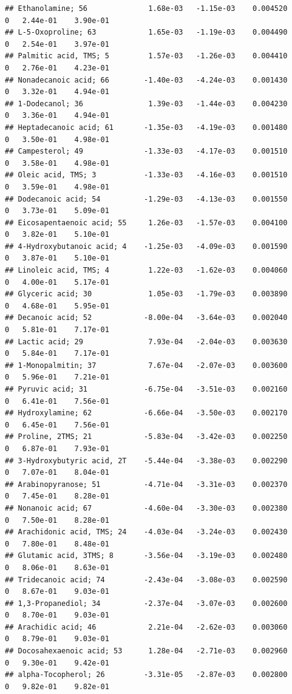 \documentclass[]{article}
\begin{document}
\begin{verbatim}
## Ethanolamine; 56              1.68e-03   -1.15e-03    0.004520         0   2.44e-01    3.90e-01
## L-5-Oxoproline; 63            1.65e-03   -1.19e-03    0.004490         0   2.54e-01    3.97e-01
## Palmitic acid, TMS; 5         1.57e-03   -1.26e-03    0.004410         0   2.76e-01    4.23e-01
## Nonadecanoic acid; 66        -1.40e-03   -4.24e-03    0.001430         0   3.32e-01    4.94e-01
## 1-Dodecanol; 36               1.39e-03   -1.44e-03    0.004230         0   3.36e-01    4.94e-01
## Heptadecanoic acid; 61       -1.35e-03   -4.19e-03    0.001480         0   3.50e-01    4.98e-01
## Campesterol; 49              -1.33e-03   -4.17e-03    0.001510         0   3.58e-01    4.98e-01
## Oleic acid, TMS; 3           -1.33e-03   -4.16e-03    0.001510         0   3.59e-01    4.98e-01
## Dodecanoic acid; 54          -1.29e-03   -4.13e-03    0.001550         0   3.73e-01    5.09e-01
## Eicosapentaenoic acid; 55     1.26e-03   -1.57e-03    0.004100         0   3.82e-01    5.10e-01
## 4-Hydroxybutanoic acid; 4    -1.25e-03   -4.09e-03    0.001590         0   3.87e-01    5.10e-01
## Linoleic acid, TMS; 4         1.22e-03   -1.62e-03    0.004060         0   4.00e-01    5.17e-01
## Glyceric acid; 30             1.05e-03   -1.79e-03    0.003890         0   4.68e-01    5.95e-01
## Decanoic acid; 52            -8.00e-04   -3.64e-03    0.002040         0   5.81e-01    7.17e-01
## Lactic acid; 29               7.93e-04   -2.04e-03    0.003630         0   5.84e-01    7.17e-01
## 1-Monopalmitin; 37            7.67e-04   -2.07e-03    0.003600         0   5.96e-01    7.21e-01
## Pyruvic acid; 31             -6.75e-04   -3.51e-03    0.002160         0   6.41e-01    7.56e-01
## Hydroxylamine; 62            -6.66e-04   -3.50e-03    0.002170         0   6.45e-01    7.56e-01
## Proline, 2TMS; 21            -5.83e-04   -3.42e-03    0.002250         0   6.87e-01    7.93e-01
## 3-Hydroxybutyric acid, 2T    -5.44e-04   -3.38e-03    0.002290         0   7.07e-01    8.04e-01
## Arabinopyranose; 51          -4.71e-04   -3.31e-03    0.002370         0   7.45e-01    8.28e-01
## Nonanoic acid; 67            -4.60e-04   -3.30e-03    0.002380         0   7.50e-01    8.28e-01
## Arachidonic acid, TMS; 24    -4.03e-04   -3.24e-03    0.002430         0   7.80e-01    8.48e-01
## Glutamic acid, 3TMS; 8       -3.56e-04   -3.19e-03    0.002480         0   8.06e-01    8.63e-01
## Tridecanoic acid; 74         -2.43e-04   -3.08e-03    0.002590         0   8.67e-01    9.03e-01
## 1,3-Propanediol; 34          -2.37e-04   -3.07e-03    0.002600         0   8.70e-01    9.03e-01
## Arachidic acid; 46            2.21e-04   -2.62e-03    0.003060         0   8.79e-01    9.03e-01
## Docosahexaenoic acid; 53      1.28e-04   -2.71e-03    0.002960         0   9.30e-01    9.42e-01
## alpha-Tocopherol; 26         -3.31e-05   -2.87e-03    0.002800         0   9.82e-01    9.82e-01
\end{verbatim}
\end{document}
